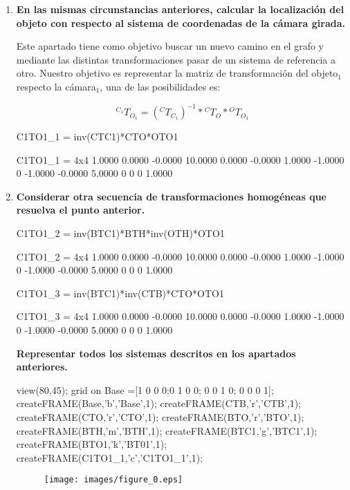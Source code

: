 \documentclass[11pt,a4paper]{article}
\begin{document}
\begin{enumerate}
    \item \textbf{En las mismas circunstancias anteriores, calcular la localización del objeto con respecto al sistema de  coordenadas de la cámara girada.}
    
    Este apartado tiene como objetivo buscar un nuevo camino en el grafo y mediante las distintas transformaciones pasar de un sistema de referencia a otro. Nuestro objetivo es representar la matriz de transformación del objeto$_1$ respecto la cámara$_1$, una de las posibilidades es:
    
    \[^{C_{1}}T_{O_1} = \left({}^CT_{C_1}\right)^{-1}*{}^CT_O*{}^OT_{O_1}\]
    
\begin{matlabcode}
C1TO1_1 = inv(CTC1)*CTO*OTO1
\end{matlabcode}
\begin{matlaboutput}
C1TO1_1 = 4x4    
    1.0000    0.0000   -0.0000   10.0000
    0.0000   -0.0000    1.0000   -1.0000
         0   -1.0000   -0.0000    5.0000
         0         0         0    1.0000

\end{matlaboutput}

    \item \textbf{Considerar otra secuencia de transformaciones homogéneas que resuelva el punto anterior.}
    
\begin{matlabcode}
C1TO1_2 = inv(BTC1)*BTH*inv(OTH)*OTO1
\end{matlabcode}
\begin{matlaboutput}
C1TO1_2 = 4x4    
    1.0000    0.0000   -0.0000   10.0000
    0.0000   -0.0000    1.0000   -1.0000
         0   -1.0000   -0.0000    5.0000
         0         0         0    1.0000

\end{matlaboutput}
\begin{matlabcode}
C1TO1_3 = inv(BTC1)*inv(CTB)*CTO*OTO1
\end{matlabcode}
\begin{matlaboutput}
C1TO1_3 = 4x4    
    1.0000    0.0000   -0.0000   10.0000
    0.0000   -0.0000    1.0000   -1.0000
         0   -1.0000   -0.0000    5.0000
         0         0         0    1.0000

\end{matlaboutput}

\textbf{Representar todos los sistemas descritos en los apartados anteriores.}

\begin{matlabcode}
view(80,45);
grid on
Base =[1 0 0 0;0 1 0 0; 0 0 1 0; 0 0 0 1];
createFRAME(Base,'b','Base',1);
createFRAME(CTB,'r','CTB',1);
createFRAME(CTO,'r','CTO',1);
createFRAME(BTO,'r','BTO',1);
createFRAME(BTH,'m','BTH',1);
createFRAME(BTC1,'g','BTC1',1);
createFRAME(BTO1,'k','BT01',1);
createFRAME(C1TO1_1,'c','C1TO1_1',1);
\end{matlabcode}
\begin{figure}[H]
    \centering
    \texttt{[image: images/figure\_0.eps]}
\end{figure}
\end{enumerate}
\end{document}
